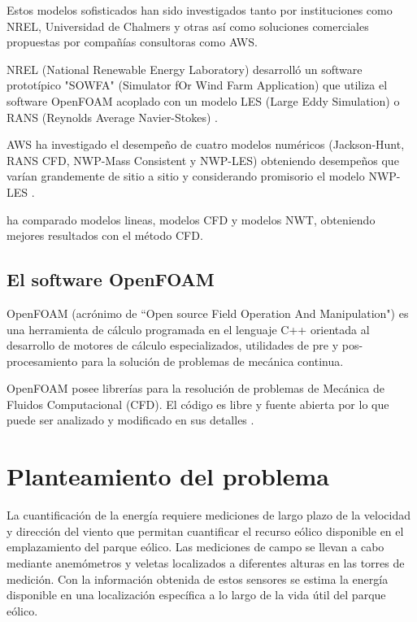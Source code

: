 Estos modelos sofisticados han sido investigados tanto por instituciones como NREL, Universidad de Chalmers y otras así como soluciones comerciales propuestas por compañías consultoras como AWS. 

NREL (National Renewable Energy Laboratory) desarrolló un software prototípico "SOWFA" (Simulator fOr Wind Farm Application) que utiliza el software OpenFOAM acoplado con un modelo LES (Large Eddy Simulation) o RANS (Reynolds Average Navier-Stokes) \citep{stull_introduction_2012}. 

AWS ha investigado el desempeño de cuatro modelos numéricos (Jackson-Hunt, RANS CFD, NWP-Mass Consistent y NWP-LES) obteniendo desempeños que varían grandemente de sitio a sitio y considerando promisorio el modelo NWP-LES \cite{brower_evaluation_2013}.

\cite{bengtsson_turbulence_????} ha comparado modelos lineas, modelos CFD y modelos NWT, obteniendo mejores resultados con el método CFD.

\subsection{El software OpenFOAM}

OpenFOAM (acrónimo de ``Open source Field Operation And Manipulation") es una herramienta de cálculo programada en el lenguaje C++ orientada al desarrollo de motores de cálculo especializados, utilidades de pre y pos-procesamiento para la solución de problemas de mecánica continua.

OpenFOAM posee librerías  para la resolución de problemas de Mecánica de Fluidos Computacional (CFD). El código es libre y fuente abierta por lo que puede ser analizado y modificado en sus detalles \citep*{wikipedia_openfoam_2016}.





\section{Planteamiento del problema}


La cuantificación de la energía requiere mediciones de largo plazo de la velocidad y dirección del viento que permitan cuantificar el recurso eólico disponible en el emplazamiento del parque eólico. Las mediciones de campo se llevan a cabo mediante anemómetros y veletas localizados a diferentes alturas en las torres de medición. Con la información obtenida de estos sensores se estima la energía disponible en una localización específica a lo largo de la vida útil del parque eólico. 

